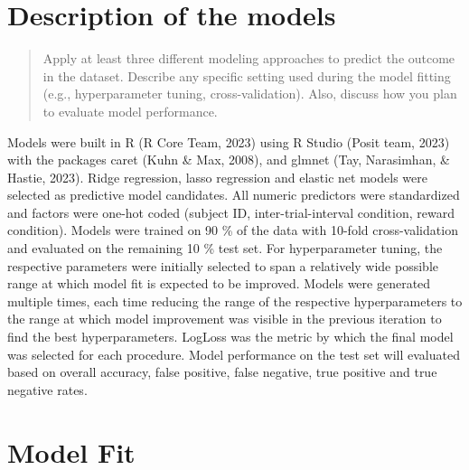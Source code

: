 \documentclass[
  man,floatsintext]{apa6}
\begin{document}
\hypertarget{description-of-the-models}{%
\section{Description of the models}\label{description-of-the-models}}

\begin{quote}
Apply at least three different modeling approaches to predict the outcome in the dataset. Describe any specific setting used during the model fitting (e.g., hyperparameter tuning, cross-validation). Also, discuss how you plan to evaluate model performance.
\end{quote}

Models were built in R (R Core Team, 2023) using R Studio (Posit team, 2023) with the packages caret (Kuhn \& Max, 2008), and glmnet (Tay, Narasimhan, \& Hastie, 2023). Ridge regression, lasso regression and elastic net models were selected as predictive model candidates. All numeric predictors were standardized and factors were one-hot coded (subject ID, inter-trial-interval condition, reward condition). Models were trained on 90 \% of the data with 10-fold cross-validation and evaluated on the remaining 10 \% test set. For hyperparameter tuning, the respective parameters were initially selected to span a relatively wide possible range at which model fit is expected to be improved. Models were generated multiple times, each time reducing the range of the respective hyperparameters to the range at which model improvement was visible in the previous iteration to find the best hyperparameters. LogLoss was the metric by which the final model was selected for each procedure. Model performance on the test set will evaluated based on overall accuracy, false positive, false negative, true positive and true negative rates.

\hypertarget{model-fit}{%
\section{Model Fit}\label{model-fit}}
\end{document}
